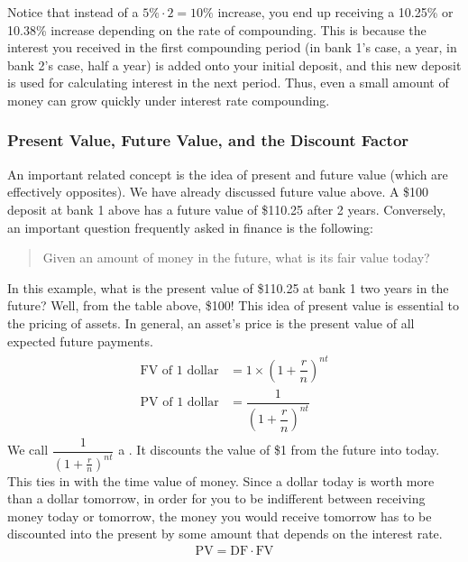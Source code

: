 \documentclass[letterpaper,10pt,english]{jupyterBook}
\begin{document}
\sphinxAtStartPar
Notice that instead of a \(5\% \cdot 2 = 10\%\) increase, you end up receiving a 10.25\% or 10.38\% increase depending on the rate of compounding. This is because the interest you received in the first compounding period (in bank 1’s case, a year, in bank 2’s case, half a year) is added onto your initial deposit, and this new deposit is used for calculating interest in the next period. Thus, even a small amount of money can grow quickly under interest rate compounding.


\subsubsection{Present Value, Future Value, and the Discount Factor}
\label{\detokenize{content/10-finance/value-interest:present-value-future-value-and-the-discount-factor}}
\sphinxAtStartPar
An important related concept is the idea of present and future value (which are effectively opposites). We have already discussed future value above. A \$100 deposit at bank 1 above has a future value of \$110.25 after 2 years. Conversely, an important question frequently asked in finance is the following:
\begin{quote}

\sphinxAtStartPar
Given an amount of money in the future, what is its fair value today?
\end{quote}

\sphinxAtStartPar
In this example, what is the present value of \$110.25 at bank 1 two years in the future? Well, from the table above, \$100! This idea of present value is essential to the pricing of assets. In general, an asset’s price is the present value of all expected future payments.
\begin{equation*}
\begin{split}\begin{aligned}
\text{FV of 1 dollar} &= 1 \times \left(1 + \dfrac{r}{n} \right)^{nt} \\
\text{PV of 1 dollar} &= \dfrac{1}{\left(1 + \dfrac{r}{n} \right)^{nt}}
\end{aligned}\end{split}
\end{equation*}
\sphinxAtStartPar
We call \(\dfrac{1}{(1 + \frac{r}{n})^{nt}}\) a . It discounts the value of \$1 from the future into today. This ties in with the time value of money. Since a dollar today is worth more than a dollar tomorrow, in order for you to be indifferent between receiving money today or tomorrow, the money you would receive tomorrow has to be discounted into the present by some amount that depends on the interest rate.
\begin{equation*}
\begin{split}
\text{PV} = \text{DF} \cdot \text{FV}
\end{split}
\end{equation*}
\end{document}
